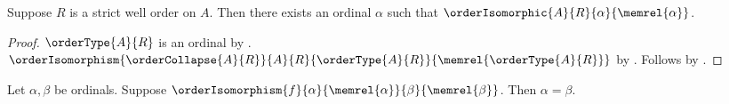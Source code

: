 \begin{theorem}\label{strict_well_order_has_ordinal_order_type}
    Suppose $R$ is a strict well order on $A$.
    Then there exists an ordinal $\alpha$ such that
        $\orderIsomorphic{A}{R}{\alpha}{\memrel{\alpha}}$.
\end{theorem}
\begin{proof}
    $\orderType{A}{R}$ is an ordinal
        by .
    $\orderIsomorphism{\orderCollapse{A}{R}}
        {A}{R}{\orderType{A}{R}}{\memrel{\orderType{A}{R}}}$
        by .
    Follows by .
\end{proof}

\begin{theorem}\label{ordinal_order_isomorphism_unique}
    Let $\alpha,\beta$ be ordinals.
    Suppose
        $\orderIsomorphism{f}{\alpha}{\memrel{\alpha}}
            {\beta}{\memrel{\beta}}$.
    Then $\alpha=\beta$.
\end{theorem}
